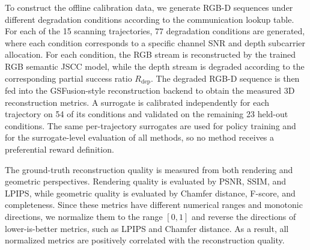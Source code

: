 \documentclass[journal]{IEEEtran}
\begin{document}
To construct the offline calibration data, we generate RGB-D sequences under different degradation conditions according to the communication lookup table. For each of the 15 scanning trajectories, 77 degradation conditions are generated, where each condition corresponds to a specific channel SNR and depth subcarrier allocation. For each condition, the RGB stream is reconstructed by the trained RGB semantic JSCC model, while the depth stream is degraded according to the corresponding partial success ratio $R_{\mathrm{dep}}$. The degraded RGB-D sequence is then fed into the GSFusion-style reconstruction backend to obtain the measured 3D reconstruction metrics. A surrogate is calibrated independently for each trajectory on 54 of its conditions and validated on the remaining 23 held-out conditions. The same per-trajectory surrogates are used for policy training and for the surrogate-level evaluation of all methods, so no method receives a preferential reward definition.

The ground-truth reconstruction quality is measured from both rendering and geometric perspectives. Rendering quality is evaluated by PSNR, SSIM, and LPIPS, while geometric quality is evaluated by Chamfer distance, F-score, and completeness. Since these metrics have different numerical ranges and monotonic directions, we normalize them to the range $[0,1]$ and reverse the directions of lower-is-better metrics, such as LPIPS and Chamfer distance. As a result, all normalized metrics are positively correlated with the reconstruction quality.
\end{document}
